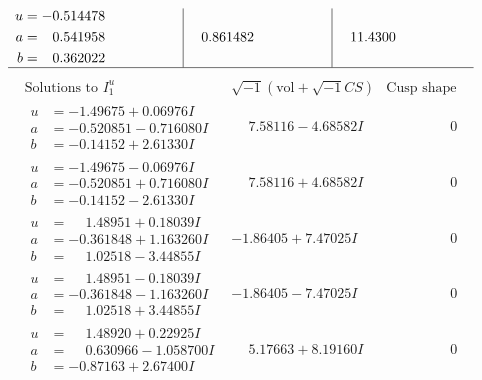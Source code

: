 \documentclass[1p]{elsarticle_modified}
\theoremstyle{definition}
\newcommand{\I}{\sqrt{-1}}
\begin{document}
$$\begin{array}{c|c|c}
\begin{aligned}
u &= -0.514478\phantom{ +0.000000I} \\
a &= \phantom{-}0.541958\phantom{ +0.000000I} \\
b &= \phantom{-}0.362022\phantom{ +0.000000I}\end{aligned}
 & \phantom{-}0.861482\phantom{ +0.000000I} & \phantom{-}11.4300\phantom{ +0.000000I}\\
 \hline 
 \end{array}$$\newpage$$\begin{array}{c|c|c}  
\text{Solutions to }I^u_{1}& \I (\text{vol} + \sqrt{-1}CS) & \text{Cusp shape}\\
 \hline 
\begin{aligned}
u &= -1.49675 + 0.06976 I \\
a &= -0.520851 - 0.716080 I \\
b &= -0.14152 + 2.61330 I\end{aligned}
 & \phantom{-}7.58116 - 4.68582 I & \phantom{-0.000000 } 0 \\ \hline\begin{aligned}
u &= -1.49675 - 0.06976 I \\
a &= -0.520851 + 0.716080 I \\
b &= -0.14152 - 2.61330 I\end{aligned}
 & \phantom{-}7.58116 + 4.68582 I & \phantom{-0.000000 } 0 \\ \hline\begin{aligned}
u &= \phantom{-}1.48951 + 0.18039 I \\
a &= -0.361848 + 1.163260 I \\
b &= \phantom{-}1.02518 - 3.44855 I\end{aligned}
 & -1.86405 + 7.47025 I & \phantom{-0.000000 } 0 \\ \hline\begin{aligned}
u &= \phantom{-}1.48951 - 0.18039 I \\
a &= -0.361848 - 1.163260 I \\
b &= \phantom{-}1.02518 + 3.44855 I\end{aligned}
 & -1.86405 - 7.47025 I & \phantom{-0.000000 } 0 \\ \hline\begin{aligned}
u &= \phantom{-}1.48920 + 0.22925 I \\
a &= \phantom{-}0.630966 - 1.058700 I \\
b &= -0.87163 + 2.67400 I\end{aligned}
 & \phantom{-}5.17663 + 8.19160 I & \phantom{-0.000000 } 0 \\ \hline\begin{aligned}

\end{aligned}
\end{array}$$
\end{document}
